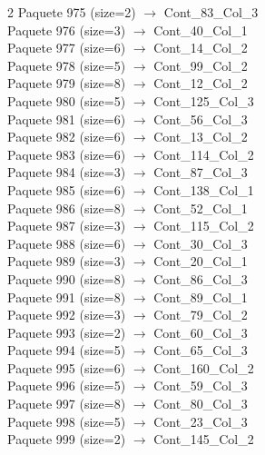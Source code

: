 \begin{multicols}{2}
Paquete 975 (size=2) $\rightarrow$ Cont\_83\_Col\_3\\
Paquete 976 (size=3) $\rightarrow$ Cont\_40\_Col\_1\\
Paquete 977 (size=6) $\rightarrow$ Cont\_14\_Col\_2\\
Paquete 978 (size=5) $\rightarrow$ Cont\_99\_Col\_2\\
Paquete 979 (size=8) $\rightarrow$ Cont\_12\_Col\_2\\
Paquete 980 (size=5) $\rightarrow$ Cont\_125\_Col\_3\\
Paquete 981 (size=6) $\rightarrow$ Cont\_56\_Col\_3\\
Paquete 982 (size=6) $\rightarrow$ Cont\_13\_Col\_2\\
Paquete 983 (size=6) $\rightarrow$ Cont\_114\_Col\_2\\
Paquete 984 (size=3) $\rightarrow$ Cont\_87\_Col\_3\\
Paquete 985 (size=6) $\rightarrow$ Cont\_138\_Col\_1\\
Paquete 986 (size=8) $\rightarrow$ Cont\_52\_Col\_1\\
Paquete 987 (size=3) $\rightarrow$ Cont\_115\_Col\_2\\
Paquete 988 (size=6) $\rightarrow$ Cont\_30\_Col\_3\\
Paquete 989 (size=3) $\rightarrow$ Cont\_20\_Col\_1\\
Paquete 990 (size=8) $\rightarrow$ Cont\_86\_Col\_3\\
Paquete 991 (size=8) $\rightarrow$ Cont\_89\_Col\_1\\
Paquete 992 (size=3) $\rightarrow$ Cont\_79\_Col\_2\\
Paquete 993 (size=2) $\rightarrow$ Cont\_60\_Col\_3\\
Paquete 994 (size=5) $\rightarrow$ Cont\_65\_Col\_3\\
Paquete 995 (size=6) $\rightarrow$ Cont\_160\_Col\_2\\
Paquete 996 (size=5) $\rightarrow$ Cont\_59\_Col\_3\\
Paquete 997 (size=8) $\rightarrow$ Cont\_80\_Col\_3\\
Paquete 998 (size=5) $\rightarrow$ Cont\_23\_Col\_3\\
Paquete 999 (size=2) $\rightarrow$ Cont\_145\_Col\_2\\
\end{multicols}

